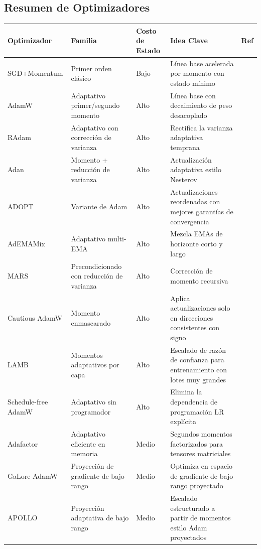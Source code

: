 \documentclass[11pt,a4paper]{article}
\begin{document}
\subsection{Resumen de Optimizadores}
\small
\begin{longtable}{p{2.2cm}p{2.8cm}p{2.0cm}p{5.4cm}p{1.8cm}}
\toprule
\textbf{Optimizador} & \textbf{Familia} & \textbf{Costo de Estado} & \textbf{Idea Clave} & \textbf{Ref} \\
\midrule
\endhead
SGD+Momentum & Primer orden clásico & Bajo & Línea base acelerada por momento con estado mínimo & \citep{polyak_1964} \\
AdamW & Adaptativo primer/segundo momento & Alto & Línea base con decaimiento de peso desacoplado & \citep{loshchilov_decoupled_2017} \\
RAdam & Adaptativo con corrección de varianza & Alto & Rectifica la varianza adaptativa temprana & \citep{liu_variance_2019} \\
Adan & Momento + reducción de varianza & Alto & Actualización adaptativa estilo Nesterov & \citep{xie_adan_2022} \\
ADOPT & Variante de Adam & Alto & Actualizaciones reordenadas con mejores garantías de convergencia & \citep{taniguchi_adopt_2024} \\
AdEMAMix & Adaptativo multi-EMA & Alto & Mezcla EMAs de horizonte corto y largo & \citep{pagliardini_ademamix_2024} \\
MARS & Precondicionado con reducción de varianza & Alto & Corrección de momento recursiva & \citep{yuan_mars_2024} \\
Cautious AdamW & Momento enmascarado & Alto & Aplica actualizaciones solo en direcciones consistentes con signo & \citep{liang_cautious_2024} \\
LAMB & Momentos adaptativos por capa & Alto & Escalado de razón de confianza para entrenamiento con lotes muy grandes & \citep{you_largebatch_2020} \\
Schedule-free AdamW & Adaptativo sin programador & Alto & Elimina la dependencia de programación LR explícita & \citep{defazio_road_2024} \\
Adafactor & Adaptativo eficiente en memoria & Medio & Segundos momentos factorizados para tensores matriciales & \citep{shazeer_adafactor_2018} \\
GaLore AdamW & Proyección de gradiente de bajo rango & Medio & Optimiza en espacio de gradiente de bajo rango proyectado & \citep{zhao_galore_2024} \\
APOLLO & Proyección adaptativa de bajo rango & Medio & Escalado estructurado a partir de momentos estilo Adam proyectados & \citep{zhu2025apollosgdlikememoryadamwlevel} \\

\end{longtable}
\end{document}
